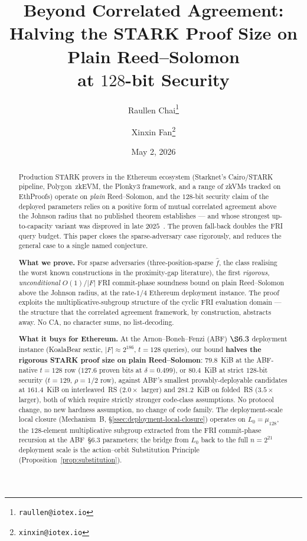 \documentclass[11pt]{article}
\title{Beyond Correlated Agreement:\\
 Halving the STARK Proof Size on Plain Reed--Solomon\\
 at $128$-bit Security}
\author[1]{Raullen Chai\thanks{\texttt{raullen@iotex.io}}}
\author[1]{Xinxin Fan\thanks{\texttt{xinxin@iotex.io}}}
\affil[1]{IoTeX Network}
\date{May 2, 2026}
\theoremstyle{definition}
\theoremstyle{remark}
\begin{document}
\maketitle

\begin{abstract}
\noindent
Production STARK provers in the Ethereum ecosystem (Starknet's
Cairo/STARK pipeline, Polygon~zkEVM, the Plonky3 framework, and a
range of zkVMs tracked on EthProofs) operate on \emph{plain}
Reed--Solomon, and the $128$-bit security claim of the deployed
parameters relies on a positive form of mutual correlated agreement
above the Johnson radius that no published theorem establishes ---
and whose strongest up-to-capacity variant was disproved in late
$2025$~\cite{CritesStewart2025,BCHKS,DiamondGruen}. The proven
fall-back doubles the FRI query budget. This paper closes the
sparse-adversary case rigorously, and reduces the general case to a
single named conjecture.

\smallskip\noindent
\textbf{What we prove.} For sparse adversaries (three-position-sparse
$\hat f$, the class realising the worst known constructions in the
proximity-gap literature), the first \emph{rigorous, unconditional}
$O(1)/|F|$ FRI commit-phase soundness bound on plain Reed--Solomon
above the Johnson radius, at the rate-$1/4$ Ethereum deployment
instance. The proof exploits the multiplicative-subgroup structure of
the cyclic FRI evaluation domain --- the structure that the correlated
agreement framework, by construction, abstracts away. No CA, no
character sums, no list-decoding.

\smallskip\noindent
\textbf{What it buys for Ethereum.} At the Arnon--Boneh--Fenzi (ABF)
$\S 6.3$ deployment instance (KoalaBear sextic, $|F| \approx 2^{186}$,
$t = 128$ queries), our bound \textbf{halves the rigorous STARK proof
size on plain Reed--Solomon}: $\mathbf{79.8}$~KiB at the ABF-native
$t = 128$ row ($127.6$ proven bits at $\delta = 0.499$), or
$\mathbf{80.4}$~KiB at strict $128$-bit security ($t = 129$,
$\rho = 1/2$ row), against ABF's smallest provably-deployable
candidates at $\mathbf{161.4}$~KiB on interleaved~RS
($\mathbf{2.0\times}$ larger) and $\mathbf{281.2}$~KiB on folded~RS
($\mathbf{3.5\times}$ larger), both of which require strictly stronger
code-class assumptions. No protocol change, no new hardness
assumption, no change of code family. The deployment-scale local
closure (Mechanism~B, \S\ref{ssec:deployment-local-closure}) operates
on $L_0 = \mu_{128}$, the $128$-element multiplicative subgroup
extracted from the FRI commit-phase recursion at the ABF~\S 6.3
parameters; the bridge from $L_0$ back to the full $n = 2^{21}$
deployment scale is the action--orbit Substitution Principle
(Proposition~\ref{prop:substitution}).


\end{abstract}
\end{document}
